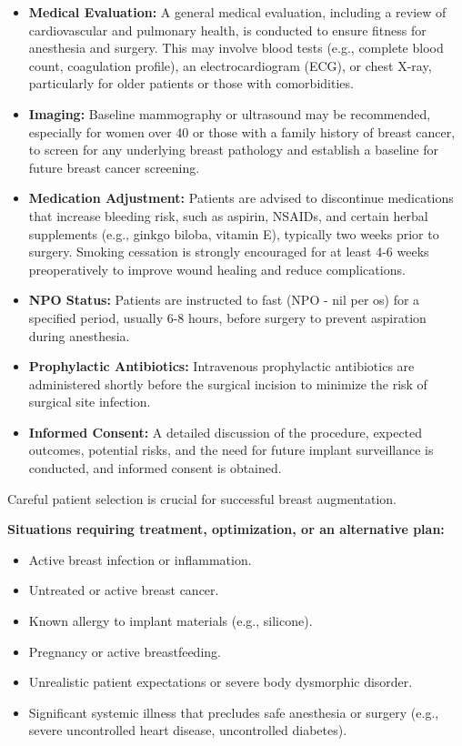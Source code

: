 \begin{itemize}
  \item \textbf{Medical Evaluation:} A general medical evaluation, including a review of cardiovascular and pulmonary health, is conducted to ensure fitness for anesthesia and surgery. This may involve blood tests (e.g., complete blood count, coagulation profile), an electrocardiogram (ECG), or chest X-ray, particularly for older patients or those with comorbidities.
  \item \textbf{Imaging:} Baseline mammography or ultrasound may be recommended, especially for women over 40 or those with a family history of breast cancer, to screen for any underlying breast pathology and establish a baseline for future breast cancer screening.
  \item \textbf{Medication Adjustment:} Patients are advised to discontinue medications that increase bleeding risk, such as aspirin, NSAIDs, and certain herbal supplements (e.g., ginkgo biloba, vitamin E), typically two weeks prior to surgery. Smoking cessation is strongly encouraged for at least 4-6 weeks preoperatively to improve wound healing and reduce complications.
  \item \textbf{NPO Status:} Patients are instructed to fast (NPO - nil per os) for a specified period, usually 6-8 hours, before surgery to prevent aspiration during anesthesia.
  \item \textbf{Prophylactic Antibiotics:} Intravenous prophylactic antibiotics are administered shortly before the surgical incision to minimize the risk of surgical site infection.
  \item \textbf{Informed Consent:} A detailed discussion of the procedure, expected outcomes, potential risks, and the need for future implant surveillance is conducted, and informed consent is obtained.
\end{itemize}

Careful patient selection is crucial for successful breast augmentation.

\textbf{Situations requiring treatment, optimization, or an alternative plan:}
\begin{itemize}
  \item Active breast infection or inflammation.
  \item Untreated or active breast cancer.
  \item Known allergy to implant materials (e.g., silicone).
  \item Pregnancy or active breastfeeding.
  \item Unrealistic patient expectations or severe body dysmorphic disorder.
  \item Significant systemic illness that precludes safe anesthesia or surgery (e.g., severe uncontrolled heart disease, uncontrolled diabetes).
\end{itemize}

